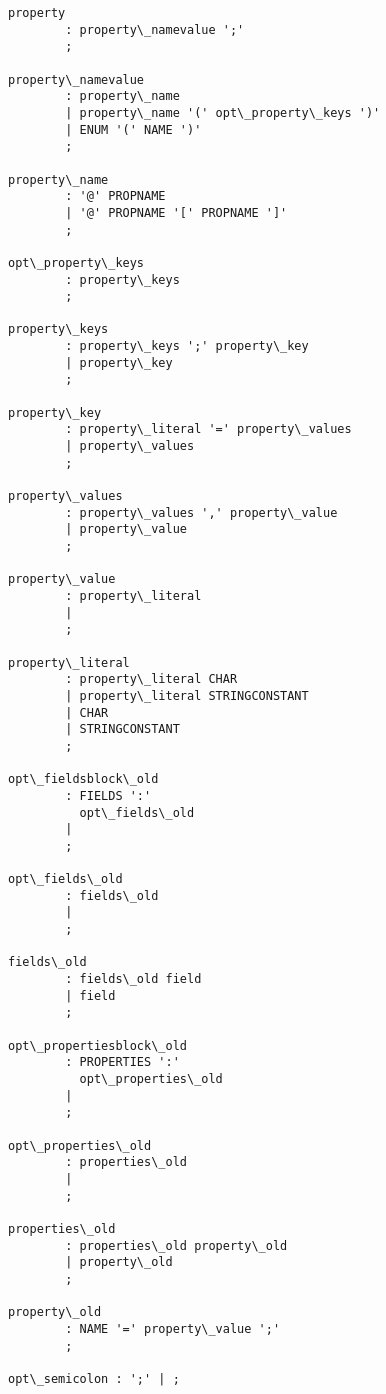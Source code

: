 \begin{Verbatim}[commandchars=\\\{\}]
property
        : property\_namevalue ';'
        ;

property\_namevalue
        : property\_name
        | property\_name '(' opt\_property\_keys ')'
        | ENUM '(' NAME ')'
        ;

property\_name
        : '@' PROPNAME
        | '@' PROPNAME '[' PROPNAME ']'
        ;

opt\_property\_keys
        : property\_keys
        ;

property\_keys
        : property\_keys ';' property\_key
        | property\_key
        ;

property\_key
        : property\_literal '=' property\_values
        | property\_values
        ;

property\_values
        : property\_values ',' property\_value
        | property\_value
        ;

property\_value
        : property\_literal
        |
        ;

property\_literal
        : property\_literal CHAR
        | property\_literal STRINGCONSTANT
        | CHAR
        | STRINGCONSTANT
        ;

opt\_fieldsblock\_old
        : FIELDS ':'
          opt\_fields\_old
        |
        ;

opt\_fields\_old
        : fields\_old
        |
        ;

fields\_old
        : fields\_old field
        | field
        ;

opt\_propertiesblock\_old
        : PROPERTIES ':'
          opt\_properties\_old
        |
        ;

opt\_properties\_old
        : properties\_old
        |
        ;

properties\_old
        : properties\_old property\_old
        | property\_old
        ;

property\_old
        : NAME '=' property\_value ';'
        ;

opt\_semicolon : ';' | ;
\end{Verbatim}



